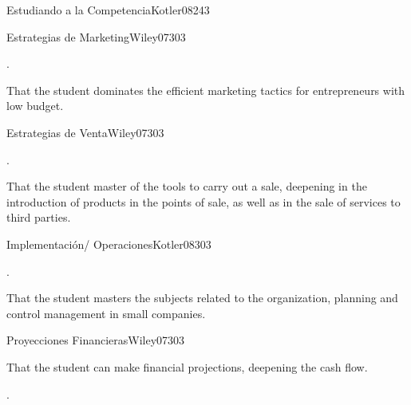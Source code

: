 \begin{syllabus}
\begin{unit}{Estudiando a la Competencia}{}{Kotler08}{24}{3}
\end{unit}

\begin{unit}{Estrategias de Marketing}{}{Wiley07}{30}{3}
   \begin{topics}
      \item . 
   \end{topics}

   \begin{learningoutcomes}
      \item That the student dominates the efficient marketing tactics for entrepreneurs with low budget.
   \end{learningoutcomes}
\end{unit}

\begin{unit}{Estrategias de Venta}{}{Wiley07}{30}{3}
   \begin{topics}
      \item .
   \end{topics}

   \begin{learningoutcomes}
      \item That the student master of the tools to carry out a sale, deepening in the introduction of products in the points of sale, as well as in the sale of services to third parties.
   \end{learningoutcomes}
\end{unit}

\begin{unit}{Implementación/ Operaciones}{}{Kotler08}{30}{3}
   \begin{topics}
      \item . 
   \end{topics}


   \begin{learningoutcomes}
      \item That the student masters the subjects related to the organization, planning and control management in small companies.
   \end{learningoutcomes}

\end{unit}

\begin{unit}{Proyecciones Financieras}{}{Wiley07}{30}{3}
   \begin{topics}
      \item That the student can make financial projections, deepening the cash flow.
   \end{topics}

   \begin{learningoutcomes}
      \item .
   \end{learningoutcomes}
\end{unit}



\begin{coursebibliography}
\end{coursebibliography}

\end{syllabus}
